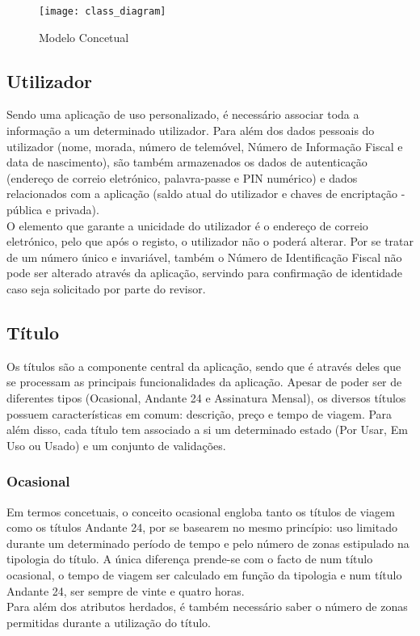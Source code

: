\begin{figure}[t]
  \begin{center}
    \leavevmode
    \texttt{[image: class\_diagram]}
    \caption{Modelo Concetual}
    \label{fig:class_diagram}
  \end{center}
\end{figure}

\subsection{Utilizador}

Sendo uma aplicação de uso personalizado, é necessário associar toda a informação a um determinado utilizador. Para além dos dados pessoais do utilizador (nome, morada, número de telemóvel, Número de Informação Fiscal e data de nascimento), são também armazenados os dados de autenticação (endereço de correio eletrónico, palavra-passe e PIN numérico) e dados relacionados com a aplicação (saldo atual do utilizador e chaves de encriptação - pública e privada).
\\O elemento que garante a unicidade do utilizador é o endereço de correio eletrónico, pelo que após o registo, o utilizador não o poderá alterar. Por se tratar de um número único e invariável, também o Número de Identificação Fiscal não pode ser alterado através da aplicação, servindo para confirmação de identidade caso seja solicitado por parte do revisor.

\subsection{Título}

Os títulos são a componente central da aplicação, sendo que é através deles que se processam as principais funcionalidades da aplicação. Apesar de poder ser de diferentes tipos (Ocasional, Andante 24 e Assinatura Mensal), os diversos títulos possuem características em comum: descrição, preço e tempo de viagem. Para além disso, cada título tem associado a si um determinado estado (Por Usar, Em Uso ou Usado) e um conjunto de validações.

\subsubsection{Ocasional}

Em termos concetuais, o conceito ocasional engloba tanto os títulos de viagem como os títulos Andante 24, por se basearem no mesmo princípio: uso limitado durante um determinado período de tempo e pelo número de zonas estipulado na tipologia do título. A única diferença prende-se com o facto de num título ocasional, o tempo de viagem ser calculado em função da tipologia e num título Andante 24, ser sempre de vinte e quatro horas.
\\Para além dos atributos herdados, é também necessário saber o número de zonas permitidas durante a utilização do título.

